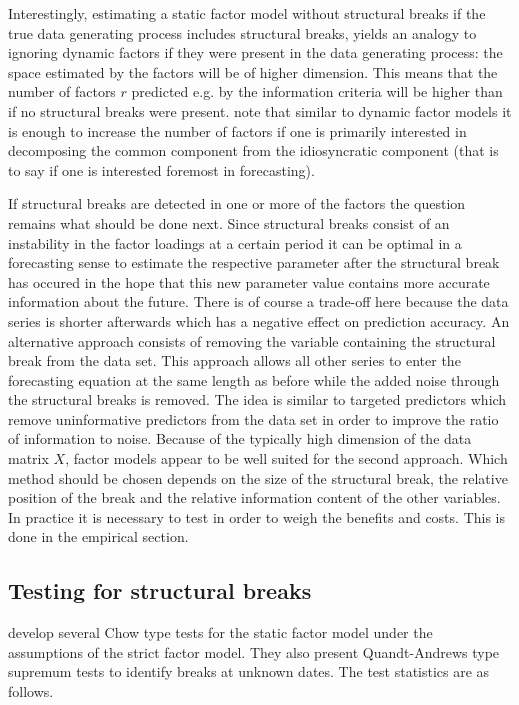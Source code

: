 \documentclass[12pt]{article}
\begin{document}
Interestingly, estimating a static factor model without structural breaks if the true data generating process includes structural breaks, yields an analogy to ignoring dynamic factors if they were present in the data generating process: the space estimated by the factors will be of higher dimension. This means that the number of factors $r$ predicted e.g. by the \citet{bai2002determining} information criteria will be higher than if no structural breaks were present. \citet{breitung2011testing} note that similar to dynamic factor models it is enough to increase the number of factors if one is primarily interested in decomposing the common component from the idiosyncratic component (that is to say if one is interested foremost in forecasting).

If structural breaks are detected in one or more of the factors the question remains what should be done next. Since structural breaks consist of an instability in the factor loadings at a certain period it can be optimal in a forecasting sense to estimate the respective parameter after the structural break has occured in the hope that this new parameter value contains more accurate information about the future. There is of course a trade-off here because the data series is shorter afterwards which has a negative effect on prediction accuracy.
An alternative approach consists of removing the variable containing the structural break from the data set. This approach allows all other series to enter the forecasting equation at the same length as before while the added noise through the structural breaks is removed. The idea is similar to targeted predictors which remove uninformative predictors from the data set in order to improve the ratio of information to noise. Because of the typically high dimension of the data matrix $X$, factor models appear to be well suited for the second approach. Which method should be chosen depends on the size of the structural break, the relative position of the break and the relative information content of the other variables. In practice it is necessary to test in order to weigh the benefits and costs. This is done in the empirical section.

\subsection{Testing for structural breaks}
\citet{breitung2011testing} develop several Chow type tests for the static factor model under the assumptions of the strict factor model. They also present Quandt-Andrews type supremum tests to identify breaks at unknown dates. The test statistics are as follows.
\end{document}

